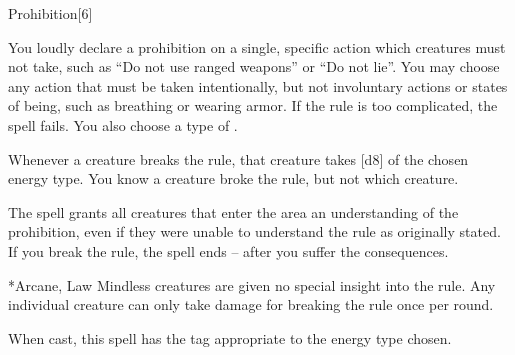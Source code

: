 \begin{spellsection}{Prohibition}[6]
    \begin{spellheader}
    \end{spellheader}
    \begin{spellcontent}
        \begin{spelltargetinginfo}
        \end{spelltargetinginfo}
        \begin{spelleffects}
            \spelleffect You loudly declare a prohibition on a single, specific action which creatures must not take, such as ``Do not use ranged weapons'' or ``Do not lie''. You may choose any action that must be taken intentionally, but not involuntary actions or states of being, such as breathing or wearing armor. If the rule is too complicated, the spell fails. You also choose a type of .

            Whenever a creature breaks the rule, that creature takes \spelldamage{}[d8] of the chosen energy type. You know a creature broke the rule, but not which creature.

            The spell grants all creatures that enter the area an understanding of the prohibition, even if they were unable to understand the rule as originally stated. If you break the rule, the spell ends -- after you suffer the consequences.
            \spelldur \durshort
        \end{spelleffects}
    \end{spellcontent}
    \begin{spellfooter}
        *{Arcane, Law}
        \spellnotes Mindless creatures are given no special insight into the rule. Any individual creature can only take damage for breaking the rule once per round.

        When cast, this spell has the tag appropriate to the energy type chosen.
        \miscastexplode
    \end{spellfooter}
    \begin{spellaugments}
    \end{spellaugments}
\end{spellsection}

